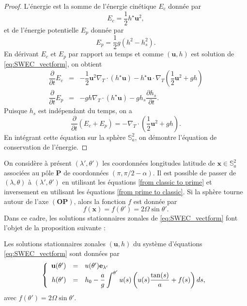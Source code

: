 \begin{proof}
L'énergie est la somme de l'énergie cinétique $E_c$ donnée par
\begin{equation}
E_c = \dfrac{1}{2} h^{\star} \mathbf{u}^2,
\end{equation}
et de l'énergie potentielle $E_p$ donnée par
\begin{equation}
E_p = \dfrac{1}{2} g (h^2 - h_s^2).
\end{equation}
En dérivant $E_c$ et $E_p$ par rapport au temps et comme $(\mathbf{u},h)$ est solution de \eqref{eq:SWEC_vectform}, on obtient
\begin{equation}
\begin{array}{rcl}
\dfrac{\partial}{\partial t} E_c & = & -\dfrac{1}{2} \mathbf{u}^2 \nabla_T \cdot \left( h^{\star} \mathbf{u} \right) - h^{\star} \mathbf{u} \cdot \nabla_T \left( \dfrac{1}{2} \mathbf{u}^2 + gh \right) \\
\dfrac{\partial}{\partial t} E_p & = & - gh \nabla_T \cdot \left( h^{\star} \mathbf{u} \right) - g h_s \dfrac{\partial h_s}{\partial t}.
\end{array}
\end{equation}
Puisque $h_s$ est indépendant du temps, on a
\begin{equation}
\dfrac{\partial}{\partial t} \left( E_c + E_p \right) = - \nabla_T \cdot \left( \dfrac{1}{2} \mathbf{u}^2 + gh \right).
\end{equation}
En intégrant cette équation sur la sphère $\mathbb{S}_a^2$, on démontre l'équation de conservation de l'énergie.
\end{proof}

On considère à présent $(\lambda',\theta')$ les coordonnées longitudes latitude de $\mathbf{x} \in \mathbb{S}_a^2$ associées au pôle $\mathbf{P}$ de coordonnées $(\pi, \pi/2-\alpha)$. Il est possible de passer de $(\lambda, \theta)$ à $(\lambda',\theta')$ en utilisant les équations \eqref{from classic to prime} et inversement en utilisant les équations \eqref{from prime to classic}. Si la sphère tourne autour de l'axe $(\mathbf{O}\mathbf{P})$, alors la fonction $f$ est donnée par
\begin{equation}
f(\mathbf{x}) = f(\theta') = 2 \Omega \sin \theta'.
\end{equation}
Dans ce cadre, les solutions stationnaires zonales de \eqref{eq:SWEC_vectform} font l'objet de la proposition suivante :
\begin{proposition}
\label{prop:swe_zonalestat}
Les solutions stationnaires zonales $(\mathbf{u}, h)$ du système d'équations \eqref{eq:SWEC_vectform} sont données par
\begin{equation}
\left\lbrace
\begin{array}{rcl}
\mathbf{u}(\theta') & = & u(\theta') \mathbf{e}_{\lambda'} \\
h(\theta') & = & h_0 - \dfrac{a}{g} \displaystyle\int^{\theta'} u(s) \left( u(s) \dfrac{\tan(s)}{a} + f(s)  \right)ds,
\end{array}
\right.
\end{equation}
avec $f(\theta') = 2 \Omega \sin \theta'$.
\end{proposition}

